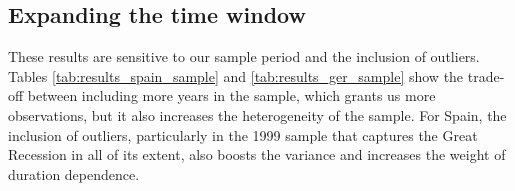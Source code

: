 \documentclass[12pt]{article}
\theoremstyle{definition}
\theoremstyle{remark}
\begin{document}
\begin{appendices}


 
\clearpage

\section{Expanding the time window}
These results are sensitive to our sample period and the inclusion of outliers. Tables \ref{tab:results_spain_sample} and \ref{tab:results_ger_sample} show the trade-off between including more years in the sample, which grants us more observations, but it also increases the heterogeneity of the sample. For Spain, the inclusion of outliers, particularly in the 1999 sample that captures the Great Recession in all of its extent, also boosts the variance and increases the weight of duration dependence.


\end{appendices}
\end{document}
